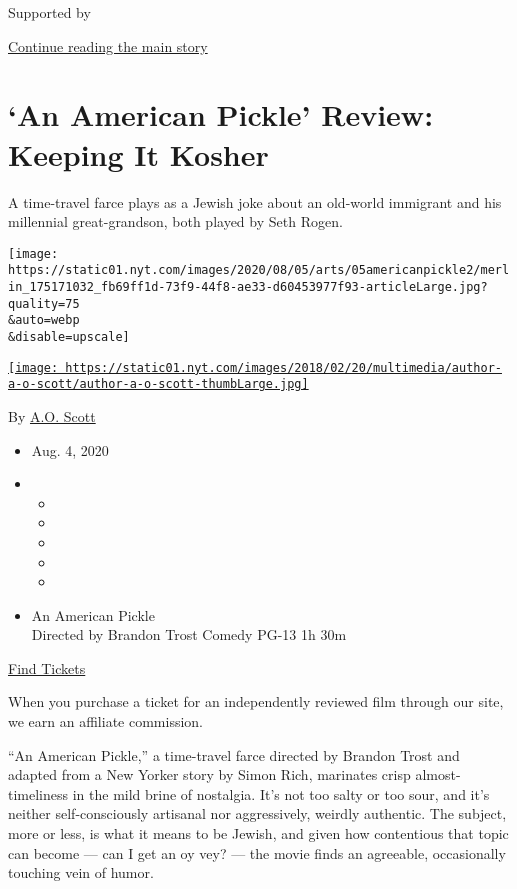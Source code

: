Supported by

\protect\hyperlink{after-sponsor}{Continue reading the main story}

\hypertarget{an-american-pickle-review-keeping-it-kosher}{%
\section{`An American Pickle' Review: Keeping It
Kosher}\label{an-american-pickle-review-keeping-it-kosher}}

A time-travel farce plays as a Jewish joke about an old-world immigrant
and his millennial great-grandson, both played by Seth Rogen.

\texttt{[image: https://static01.nyt.com/images/2020/08/05/arts/05americanpickle2/merlin\_175171032\_fb69ff1d-73f9-44f8-ae33-d60453977f93-articleLarge.jpg?quality=75\\\&auto=webp\\\&disable=upscale]}

\href{https://www.nytimes.com/by/a-o--scott}{\texttt{[image: https://static01.nyt.com/images/2018/02/20/multimedia/author-a-o-scott/author-a-o-scott-thumbLarge.jpg]}}

By \href{https://www.nytimes.com/by/a-o--scott}{A.O. Scott}

\begin{itemize}
\item
  Aug. 4, 2020
\item
  \begin{itemize}
  \item
  \item
  \item
  \item
  \item
  \end{itemize}
\end{itemize}

\begin{itemize}
\tightlist
\item
  An American Pickle\\
  Directed by Brandon Trost Comedy PG-13 1h 30m
\end{itemize}

\href{https://www.imdb.com/showtimes/title/tt9059704?ref_=ref_ext_NYT}{Find
Tickets}

When you purchase a ticket for an independently reviewed film through
our site, we earn an affiliate commission.

``An American Pickle,'' a time-travel farce directed by Brandon Trost
and adapted from a New Yorker story by Simon Rich, marinates crisp
almost-timeliness in the mild brine of nostalgia. It's not too salty or
too sour, and it's neither self-consciously artisanal nor aggressively,
weirdly authentic. The subject, more or less, is what it means to be
Jewish, and given how contentious that topic can become --- can I get an
oy vey? --- the movie finds an agreeable, occasionally touching vein of
humor.


